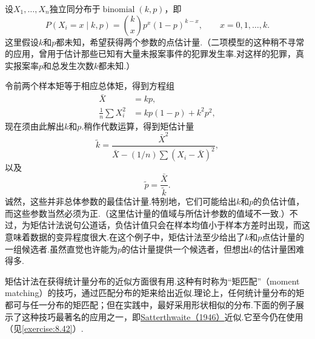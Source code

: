 \begin{example}[二项分布的矩估计]\label{ex:7.2.2}
设$X_1,\ldots,X_n$独立同分布于$\operatorname{binomial}(k,p)$，即
$$P(X_i=x\mid k,p)=\binom kx p^x(1-p)^{k-x},\qquad x=0,1,\ldots,k.$$
这里假设$k$和$p$都未知，希望获得两个参数的点估计量.（二项模型的这种稍不寻常的应用，曾用于估计那些已知有大量未报案事件的犯罪发生率.对这样的犯罪，真实报案率$p$和总发生次数$k$都未知.）

令前两个样本矩等于相应总体矩，得到方程组
\begin{align*}
\bar X&=kp,\\
\frac1n\sum X_i^2&=kp(1-p)+k^2p^2,
\end{align*}
现在须由此解出$k$和$p$.稍作代数运算，得到矩估计量
$$\widetilde k=\frac{\bar X^2}{\bar X-(1/n)\sum(X_i-\bar X)^2},$$
以及
$$\widetilde p=\frac{\bar X}{\widetilde k}.$$
诚然，这些并非总体参数的最佳估计量.特别地，它们可能给出$k$和$p$的负估计值，而这些参数当然必须为正.（这里估计量的值域与所估计参数的值域不一致.）不过，为矩估计法说句公道话，负估计值只会在样本均值小于样本方差时出现，而这意味着数据的变异程度很大.在这个例子中，矩估计法至少给出了$k$和$p$点估计量的一组候选者.虽然直觉也许能为$p$的估计量提供一个候选者，但想出$k$的估计量困难得多.
\end{example}
矩估计法在获得统计量分布的近似方面很有用.这种有时称为“矩匹配”（moment matching）的技巧，通过匹配分布的矩来给出近似.理论上，任何统计量分布的矩都可与任一分布的矩匹配；但在实践中，最好采用形状相似的分布.下面的例子展示了这种技巧最著名的应用之一，即\hyperref[bib:source272]{Satterthwaite（1946）}近似.它至今仍在使用（见\autoref{exercise:8.42}）.
